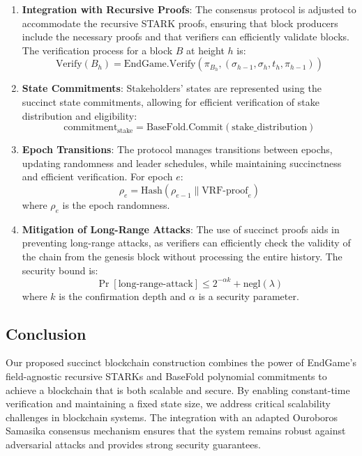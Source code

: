 \documentclass{article}
\theoremstyle{plain}
\theoremstyle{definition}
\theoremstyle{remark}
\theoremstyle{problem}
\begin{document}
\begin{enumerate}
    \item \textbf{Integration with Recursive Proofs}: The consensus protocol is adjusted to accommodate the recursive STARK proofs, ensuring that block producers include the necessary proofs and that verifiers can efficiently validate blocks. The verification process for a block $B$ at height $h$ is:
    \[
    \text{Verify}(B_h) = \text{EndGame.Verify}(\pi_{B_h}, (\sigma_{h-1}, \sigma_h, t_h, \pi_{h-1}))
    \]

    \item \textbf{State Commitments}: Stakeholders' states are represented using the succinct state commitments, allowing for efficient verification of stake distribution and eligibility:
    \[
    \text{commitment}_{\text{stake}} = \text{BaseFold.Commit}(\text{stake\_distribution})
    \]

    \item \textbf{Epoch Transitions}: The protocol manages transitions between epochs, updating randomness and leader schedules, while maintaining succinctness and efficient verification. For epoch $e$:
    \[
    \rho_e = \text{Hash}(\rho_{e-1} \| \text{VRF-proof}_e)
    \]
    where $\rho_e$ is the epoch randomness.

    \item \textbf{Mitigation of Long-Range Attacks}: The use of succinct proofs aids in preventing long-range attacks, as verifiers can efficiently check the validity of the chain from the genesis block without processing the entire history. The security bound is:
    \[
    \Pr[\text{long-range-attack}] \leq 2^{-\alpha k} + \text{negl}(\lambda)
    \]
    where $k$ is the confirmation depth and $\alpha$ is a security parameter.
\end{enumerate}

\subsection{Conclusion}

Our proposed succinct blockchain construction combines the power of EndGame's field-agnostic recursive STARKs and BaseFold polynomial commitments to achieve a blockchain that is both scalable and secure. By enabling constant-time verification and maintaining a fixed state size, we address critical scalability challenges in blockchain systems. The integration with an adapted Ouroboros Samasika consensus mechanism ensures that the system remains robust against adversarial attacks and provides strong security guarantees.
\end{document}
